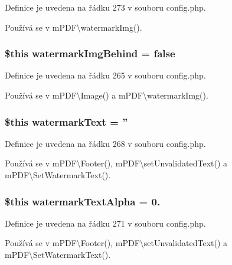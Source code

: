 Definice je uvedena na řádku 273 v souboru config.\-php.



Používá se v m\-P\-D\-F\textbackslash{}watermark\-Img().

\hypertarget{config_8php_a14151ee6d472a768e92d4f9130831727}{
\subsubsection[{watermark\-Img\-Behind}]{\setlength{\rightskip}{0pt plus 5cm}\$this watermark\-Img\-Behind = {\bf false}}}\label{config_8php_a14151ee6d472a768e92d4f9130831727}


Definice je uvedena na řádku 265 v souboru config.\-php.



Používá se v m\-P\-D\-F\textbackslash{}\-Image() a m\-P\-D\-F\textbackslash{}watermark\-Img().

\hypertarget{config_8php_aeb7a44f5b9bb8f22ff1f80cae7d4a778}{
\subsubsection[{watermark\-Text}]{\setlength{\rightskip}{0pt plus 5cm}\$this watermark\-Text = ''}}\label{config_8php_aeb7a44f5b9bb8f22ff1f80cae7d4a778}


Definice je uvedena na řádku 268 v souboru config.\-php.



Používá se v m\-P\-D\-F\textbackslash{}\-Footer(), m\-P\-D\-F\textbackslash{}set\-Unvalidated\-Text() a m\-P\-D\-F\textbackslash{}\-Set\-Watermark\-Text().

\hypertarget{config_8php_ae9c2d78b34fcbc818fdcfac2f0fff4c4}{
\subsubsection[{watermark\-Text\-Alpha}]{\setlength{\rightskip}{0pt plus 5cm}\$this watermark\-Text\-Alpha = 0.}}\label{config_8php_ae9c2d78b34fcbc818fdcfac2f0fff4c4}


Definice je uvedena na řádku 271 v souboru config.\-php.



Používá se v m\-P\-D\-F\textbackslash{}\-Footer(), m\-P\-D\-F\textbackslash{}set\-Unvalidated\-Text() a m\-P\-D\-F\textbackslash{}\-Set\-Watermark\-Text().

